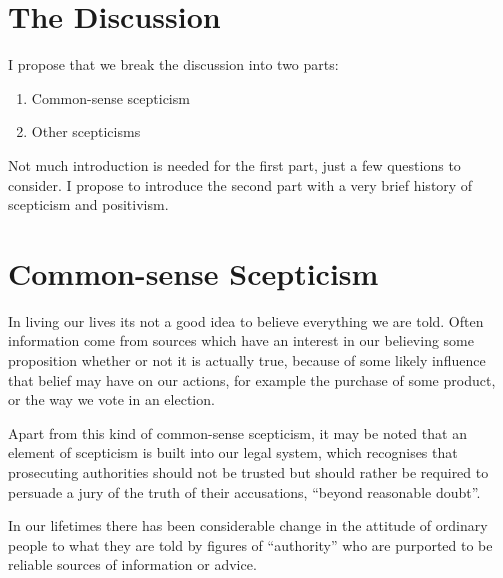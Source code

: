 \documentclass[14pt,titlepage]{extarticle}
\newcommand{\ignore}[1]{}
\begin{document}
\ignore{
I am proposing that we should discuss scepticism and also touch upon positivism (a moderated or constructive scepticism which Scruton does not talk about but which connects with several of the -isms he does mention).

I propose that we start out discussing the kinds of scepticism appropriate in everyday life, and the disadvantages and dangers of being gullible or credulous, and then move on to the character and significance of scepticism through the history of philosophy, leading into the connection with positivism.
}%

\section{The Discussion}

I propose that we break the discussion into two parts:
\begin{enumerate}
\item Common-sense scepticism
\item Other scepticisms
\end{enumerate}

Not much introduction is needed for the first part, just a few questions to consider.
I propose to introduce the second part with a very brief history of scepticism and positivism.

\section{Common-sense Scepticism}

In living our lives its not a good idea to believe everything we are told.
Often information come from sources which have an interest in our believing some proposition whether or not it is actually true, because of some likely influence that belief may have on our actions, for example the purchase of some product, or the way we vote in an election.

Apart from this kind of common-sense scepticism, it may be noted that an element of scepticism is built into our legal system, which recognises that prosecuting authorities should not be trusted but should rather be required to persuade a jury of the truth of their accusations, ``beyond reasonable doubt''.

In our lifetimes there has been considerable change in the attitude of ordinary people to what they are told by figures of ``authority'' who are purported to be reliable sources of information or advice.
\end{document}
